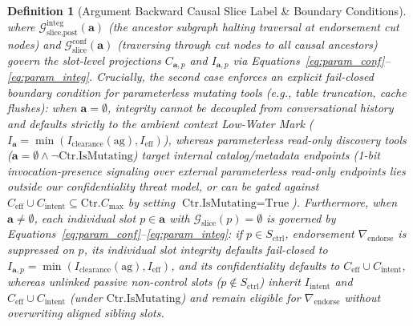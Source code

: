 \documentclass[conference,10pt]{IEEEtran}
\newtheorem{definition}{Definition}
\begin{document}
\begin{definition}[Argument Backward Causal Slice Label \& Boundary Conditions]
where $\mathcal{G}_{\text{slice,post}}^{\text{integ}}(\mathbf{a})$ (the ancestor subgraph halting traversal at endorsement cut nodes) and $\mathcal{G}_{\text{slice}}^{\text{conf}}(\mathbf{a})$ (traversing through cut nodes to all causal ancestors) govern the slot-level projections $C_{\mathbf{a}, p}$ and $I_{\mathbf{a}, p}$ via Equations~\eqref{eq:param_conf}--\eqref{eq:param_integ}. Crucially, the second case enforces an explicit fail-closed boundary condition for parameterless mutating tools (e.g., table truncation, cache flushes): when $\mathbf{a} = \emptyset$, integrity cannot be decoupled from conversational history and defaults strictly to the ambient context Low-Water Mark ($I_{\mathbf{a}} = \min(I_{\text{clearance}}(\text{ag}), I_{\text{eff}})$), whereas parameterless read-only discovery tools ($\mathbf{a} = \emptyset \land \neg\text{Ctr.IsMutating}$) target internal catalog/metadata endpoints (1-bit invocation-presence signaling over external parameterless read-only endpoints lies outside our confidentiality threat model, or can be gated against $C_{\text{eff}} \cup C_{\text{intent}} \subseteq \text{Ctr}.C_{\text{max}}$ by setting $\text{Ctr.IsMutating} = \text{True}$). Furthermore, when $\mathbf{a} \ne \emptyset$, each individual slot $p \in \mathbf{a}$ with $\mathcal{G}_{\text{slice}}(p) = \emptyset$ is governed by Equations~\eqref{eq:param_conf}--\eqref{eq:param_integ}: if $p \in S_{\text{ctrl}}$, endorsement $\nabla_{\text{endorse}}$ is suppressed on $p$, its individual slot integrity defaults fail-closed to $I_{\mathbf{a}, p} = \min(I_{\text{clearance}}(\text{ag}), I_{\text{eff}})$, and its confidentiality defaults to $C_{\text{eff}} \cup C_{\text{intent}}$, whereas unlinked passive non-control slots ($p \notin S_{\text{ctrl}}$) inherit $I_{\text{intent}}$ and $C_{\text{eff}} \cup C_{\text{intent}}$ (under $\text{Ctr.IsMutating}$) and remain eligible for $\nabla_{\text{endorse}}$ without overwriting aligned sibling slots.
\end{definition}
\end{document}
